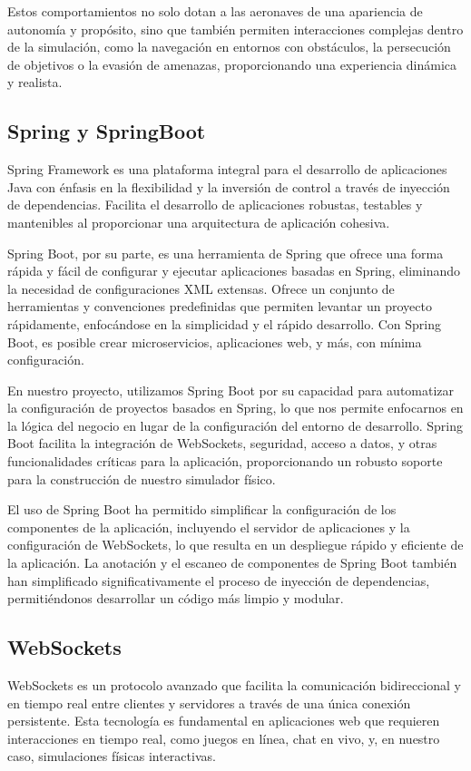 Estos comportamientos no solo dotan a las aeronaves de una apariencia de autonomía y propósito, sino que también permiten interacciones complejas dentro de la simulación, como la navegación en entornos con obstáculos, la persecución de objetivos o la evasión de amenazas, proporcionando una experiencia dinámica y realista.


\subsection{Spring y SpringBoot}
Spring Framework es una plataforma integral para el desarrollo de aplicaciones Java con énfasis en la flexibilidad y la inversión de control a través de inyección de dependencias. Facilita el desarrollo de aplicaciones robustas, testables y mantenibles al proporcionar una arquitectura de aplicación cohesiva.

Spring Boot, por su parte, es una herramienta de Spring que ofrece una forma rápida y fácil de configurar y ejecutar aplicaciones basadas en Spring, eliminando la necesidad de configuraciones XML extensas. Ofrece un conjunto de herramientas y convenciones predefinidas que permiten levantar un proyecto rápidamente, enfocándose en la simplicidad y el rápido desarrollo. Con Spring Boot, es posible crear microservicios, aplicaciones web, y más, con mínima configuración.

En nuestro proyecto, utilizamos Spring Boot por su capacidad para automatizar la configuración de proyectos basados en Spring, lo que nos permite enfocarnos en la lógica del negocio en lugar de la configuración del entorno de desarrollo. Spring Boot facilita la integración de WebSockets, seguridad, acceso a datos, y otras funcionalidades críticas para la aplicación, proporcionando un robusto soporte para la construcción de nuestro simulador físico.

El uso de Spring Boot ha permitido simplificar la configuración de los componentes de la aplicación, incluyendo el servidor de aplicaciones y la configuración de WebSockets, lo que resulta en un despliegue rápido y eficiente de la aplicación. La anotación y el escaneo de componentes de Spring Boot también han simplificado significativamente el proceso de inyección de dependencias, permitiéndonos desarrollar un código más limpio y modular.

\subsection{WebSockets}
WebSockets es un protocolo avanzado que facilita la comunicación bidireccional y en tiempo real entre clientes y servidores a través de una única conexión persistente. Esta tecnología es fundamental en aplicaciones web que requieren interacciones en tiempo real, como juegos en línea, chat en vivo, y, en nuestro caso, simulaciones físicas interactivas.


